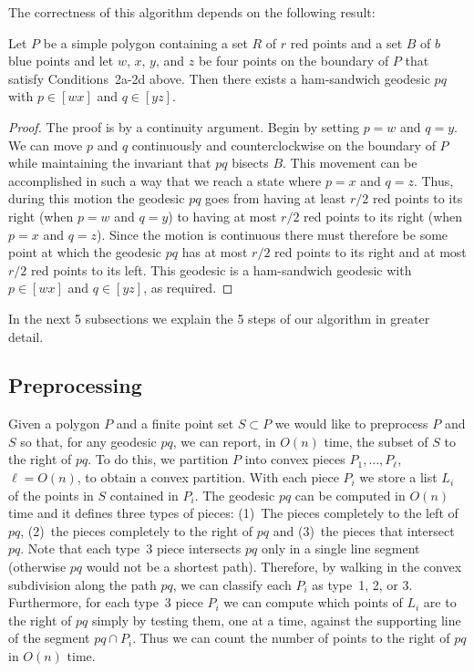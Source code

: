 \documentclass[charterfonts,lotsofwhite]{patmorin}
\newcommand{\chain}[2]{[#1#2]}
\begin{document}
The correctness of this algorithm depends on the following result:

\begin{lem}
Let $P$ be a simple polygon containing a set $R$ of $r$ red points and
a set $B$ of $b$ blue
points and let $w$, $x$, $y$, and $z$ be four points on the boundary
of $P$ that satisfy Conditions~2a-2d above.  Then there exists a
ham-sandwich geodesic $pq$ with $p\in\chain{w}{x}$ and $q\in\chain{y}{z}$.
\end{lem}

\begin{proof}
The proof is by a continuity argument.  Begin by setting $p=w$ and
$q=y$.  We can move $p$ and $q$ continuously and counterclockwise on
the boundary of $P$ while maintaining the invariant that $pq$ bisects
$B$.  This movement can be accomplished in such a way that we
reach a state where $p=x$ and $q=z$.  Thus, during this motion the
geodesic $pq$ goes from having at least $r/2$ red points to its right
(when $p=w$ and $q=y$) to having at most $r/2$ red points to its right 
(when $p=x$ and $q=z$).  Since the motion is continuous there must
therefore be some point at which the geodesic $pq$ has at most $r/2$
red points to its right and at most $r/2$ red points to its left.
This geodesic is a ham-sandwich geodesic with $p\in\chain{w}{x}$ and
$q\in\chain{y}{z}$, as required.
\end{proof}

In the next 5 subsections we explain the 5 steps of our algorithm in
greater detail.

\subsection{Preprocessing}

Given a polygon $P$ and a finite point set $S\subset P$ we would like
to preprocess $P$ and $S$ so that, for any geodesic $pq$, we can
report, in $O(n)$ time, the subset of $S$ to the right of $pq$.  To do
this, we partition $P$ into convex pieces $P_1,\ldots,P_\ell$,
$\ell=O(n)$, to obtain a convex partition.  With each piece $P_i$ we
store a list $L_i$ of the points in $S$ contained in $P_i$.  The
geodesic $pq$ can be computed in $O(n)$ time \cite{lp84} and it defines three
types of pieces: (1)~The pieces completely to the left of $pq$,
(2)~the pieces completely to the right of $pq$ and (3)~the pieces that
intersect $pq$.  Note that each type~3 piece intersects $pq$ only in a
single line segment (otherwise $pq$ would not be a shortest path).
Therefore, by walking in the convex subdivision along the path $pq$,
we can classify each $P_i$ as type~1, 2, or 3.  Furthermore, for each
type~3 piece $P_i$ we can compute which points of $L_i$ are to the
right of $pq$ simply by testing them, one at a time, against the
supporting line of the segment $pq\cap P_i$.  Thus we can count the
number of points to the right of $pq$ in $O(n)$ time.
\end{document}
